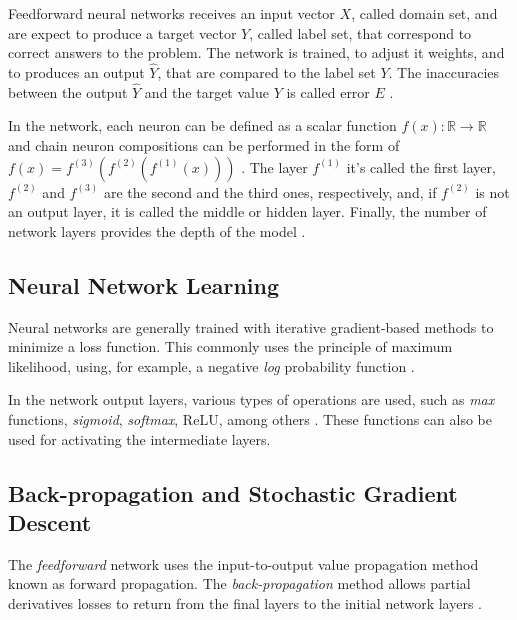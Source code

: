 Feedforward neural networks receives an input vector $X$, called domain set, and are expect to produce a target vector $Y$, called label set, that correspond to correct answers to the problem. 
The network is trained, to adjust it weights, and to produces an output $\hat{Y}$, that are compared to the label set $Y$.
The inaccuracies between the output $\hat{Y}$ and the target value $Y$ is called error $E$ \cite{Marsland:2014} \cite{ShalevShwartz:2014:UML:2621980}.

In the network, each neuron can be defined as a scalar function $f(x): \mathbb{R} \rightarrow \mathbb{R}$ and chain neuron compositions can be performed in the form of $f(x) = f^{(3)} (f^{(2)} (f^{(1)} (x)))$ . 
The layer $f^{(1)}$ it's called the first layer, $f^{(2)}$ and $f^{(3)}$ are the second and the third ones, respectively, and, if $f^{(2)}$ is not an output layer, it is called the middle or hidden layer.
Finally, the number of network layers provides the depth of the model \cite{ShalevShwartz:2014:UML:2621980} \cite[Ch. 6]{Goodfellow2016}.

\subsection{Neural Network Learning}
\label{cap2_nn_learning}

Neural networks are generally trained with iterative gradient-based methods to minimize a loss function.
This commonly uses the principle of maximum likelihood, using, for example, a negative \textit{log} probability function \cite{Goodfellow2016}. 

In the network output layers, various types of operations are used, such as \textit{max} functions, \textit{sigmoid}, \textit{softmax}, \ac{ReLU}, among others \cite[Ch. 8]{Goodfellow2016}. 
These functions can also be used for activating the intermediate layers.

\subsection{Back-propagation and Stochastic Gradient Descent}
\label{cap2_nn_feed_backpropag}

The \textit{feedforward} network uses the input-to-output value propagation method known as forward propagation. 
The \textit{back-propagation} method allows partial derivatives losses to return from the final layers to the initial network layers \cite[Ch. 8]{Goodfellow2016} \cite{Rumelhart1988}. 

